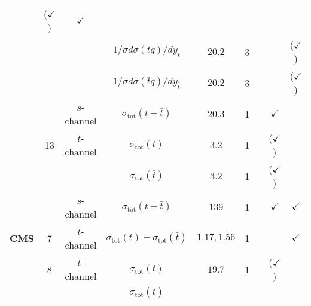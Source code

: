 \begin{table}[t]
\begin{center}
{\begin{tabular}{lcccccc|c|c}
          & ($\checkmark$)                                                                    
      &   $\checkmark$     \\
    & 
    &
    & $1/\sigma d\sigma(tq)/dy_t$ 
    & $20.2$
    & 3
    & \cite{Aaboud:2017pdi}
     &
       & ($\checkmark$)\\
    & 
    &
    & $1/\sigma d\sigma(\bar{t}q)/dy_{\bar{t}}$ 
    & $20.2$
    & 3
    & \cite{Aaboud:2017pdi}
     &
       & ($\checkmark$)\\
    & 
    & $s$-channel
    & $\sigma_{\text{tot}}(t + \bar{t})$
    & $20.3$
    & 1
    & \cite{Aad:2015upn} 
     & $\checkmark$
    & \\
    \midrule
    & 13
    & $t$-channel
    & $\sigma_{\text{tot}}(t)$
    & $3.2$
    & 1
    & \cite{Aaboud:2016ymp}  
     & ($\checkmark$)
     & \\
    & 
    &
    & $\sigma_{\text{tot}}(\bar{t})$
    & $3.2$
    & 1
    &  \cite{Aaboud:2016ymp}  
     & ($\checkmark$)
     & \\
    & 
    & $s$-channel
    & $\sigma_{\text{tot}}(t + \bar{t})$ 
    & $139$
    & 1
    & \cite{ATLAS:2022wfk}
     & $\checkmark$
     & $\checkmark$\\
    \midrule
    \midrule
      {\bf CMS}
     & 7
    & $t$-channel
    & $\sigma_{\text{tot}}(t) + \sigma_{\text{tot}}(\bar{t})$  
    & $1.17, 1.56$
    & 1
    & \cite{CMS:2012xhh}
     &
      & $\checkmark$\\
      \midrule
    & 8
    & $t$-channel
    & $\sigma_{\text{tot}}(t)$
    & $19.7$
    & 1
    & \cite{Khachatryan:2014iya}
     & ($\checkmark$)
     & \\
    & 
    &
    & $\sigma_{\text{tot}}(\bar{t})$

\end{tabular}}
\end{center}
\end{table}
